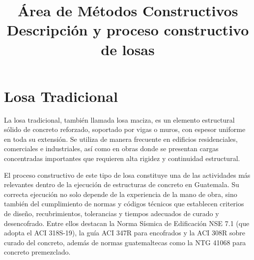 \documentclass[12pt,a4paper]{article}
\begin{document}
	\thispagestyle{fancy} 
	
	
	\title{\vspace{-2cm}Área de Métodos Constructivos
	\\ Descripción y proceso constructivo de losas}
	\author{}
	\date{}
	
	
	
	
	
	
	\maketitle
	
	\vspace{-2.5cm}
	
	
	
	
	
	
	
	
	




	\section{Losa Tradicional}

La losa tradicional, también llamada losa maciza, es un elemento estructural sólido de concreto reforzado, soportado por vigas o muros, con espesor uniforme en toda su extensión. Se utiliza de manera frecuente en edificios residenciales, comerciales e industriales, así como en obras donde se presentan cargas concentradas importantes que requieren alta rigidez y continuidad estructural.

El proceso constructivo de este tipo de losa constituye una de las actividades más relevantes dentro de la ejecución de estructuras de concreto en Guatemala. Su correcta ejecución no solo depende de la experiencia de la mano de obra, sino también del cumplimiento de normas y códigos técnicos que establecen criterios de diseño, recubrimientos, tolerancias y tiempos adecuados de curado y desencofrado. Entre ellos destacan la Norma Sísmica de Edificación NSE 7.1 (que adopta el ACI 318S-19), la guía ACI 347R para encofrados y la ACI 308R sobre curado del concreto, además de normas guatemaltecas como la NTG 41068 para concreto premezclado.
\end{document}
